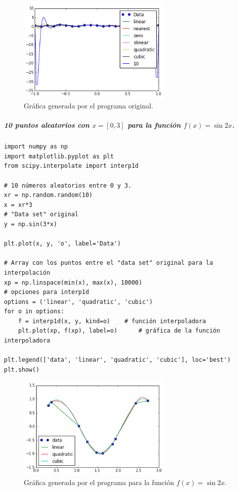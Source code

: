 \documentclass[12pt]{article}
\begin{document}
\begin{figure}[H]
\centering
\includegraphics[width=7.5cm]{1}
\caption{Gráfica generada por el programa original.}
\end{figure}

\subparagraph*{10 puntos aleatorios con $x=[0,3]$ para la función $f(x)= \sin{2x}$.}
\begin{verbatim}
import numpy as np
import matplotlib.pyplot as plt
from scipy.interpolate import interp1d

# 10 números aleatorios entre 0 y 3.
xr = np.random.random(10)
x = xr*3
# "Data set" original
y = np.sin(3*x)

plt.plot(x, y, 'o', label='Data')

# Array con los puntos entre el "data set" original para la interpolación
xp = np.linspace(min(x), max(x), 10000)
# opciones para interp1d
options = ('linear', 'quadratic', 'cubic')
for o in options:
    f = interp1d(x, y, kind=o)    # función interpoladora
    plt.plot(xp, f(xp), label=o)      # gráfica de la función interpoladora
    
plt.legend(['data', 'linear', 'quadratic', 'cubic'], loc='best')
plt.show()
\end{verbatim}

\begin{figure}[H]
\centering
\includegraphics[width=7.5cm]{3}
\caption{Gráfica generada por el programa para la función $f(x)= \sin{2x}$.}
\end{figure}
\end{document}
